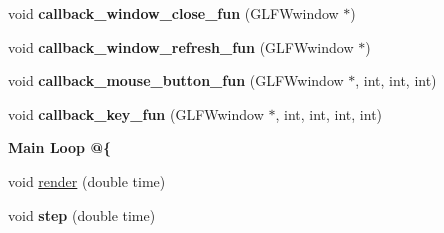 \begin{DoxyCompactItemize}
\item 
\hypertarget{classNeb_1_1Graphics_1_1Window_1_1Base_abb8bb12eacf4e20902af01c06a37cca8}{void {\bfseries callback\-\_\-window\-\_\-close\-\_\-fun} (\-G\-L\-F\-Wwindow $\ast$)}\label{classNeb_1_1Graphics_1_1Window_1_1Base_abb8bb12eacf4e20902af01c06a37cca8}

\item 
\hypertarget{classNeb_1_1Graphics_1_1Window_1_1Base_aa369484b62b908065055164d2886e840}{void {\bfseries callback\-\_\-window\-\_\-refresh\-\_\-fun} (\-G\-L\-F\-Wwindow $\ast$)}\label{classNeb_1_1Graphics_1_1Window_1_1Base_aa369484b62b908065055164d2886e840}

\item 
\hypertarget{classNeb_1_1Graphics_1_1Window_1_1Base_a4066dcc28ad3783ab3f7fa3ebc1ac82d}{void {\bfseries callback\-\_\-mouse\-\_\-button\-\_\-fun} (\-G\-L\-F\-Wwindow $\ast$, int, int, int)}\label{classNeb_1_1Graphics_1_1Window_1_1Base_a4066dcc28ad3783ab3f7fa3ebc1ac82d}

\item 
\hypertarget{classNeb_1_1Graphics_1_1Window_1_1Base_a5cb1f1c50b2fd077c557ff6967288fba}{void {\bfseries callback\-\_\-key\-\_\-fun} (\-G\-L\-F\-Wwindow $\ast$, int, int, int, int)}\label{classNeb_1_1Graphics_1_1Window_1_1Base_a5cb1f1c50b2fd077c557ff6967288fba}

\end{DoxyCompactItemize}
\begin{Indent}{\bf \-Main \-Loop @\{}\par
\begin{DoxyCompactItemize}
\item 
void \hyperlink{classNeb_1_1Graphics_1_1Window_1_1Base_adc53fbf523d1dab863f767c5cb534a77}{render} (double time)
\item 
\hypertarget{classNeb_1_1Graphics_1_1Window_1_1Base_a2fd329c3b4f33590a9e26acf1affcb8d}{void {\bfseries step} (double time)}\label{classNeb_1_1Graphics_1_1Window_1_1Base_a2fd329c3b4f33590a9e26acf1affcb8d}

\end{DoxyCompactItemize}
\end{Indent}
